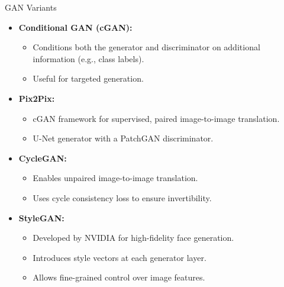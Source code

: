 \begin{frame}[allowframebreaks]{GAN Variants}
\begin{itemize}
        \item \textbf{Conditional GAN (cGAN):}
        \begin{itemize}
            \item Conditions both the generator and discriminator on additional information (e.g., class labels).
            \item Useful for targeted generation.
        \end{itemize}
        \item \textbf{Pix2Pix:}
        \begin{itemize}
            \item cGAN framework for supervised, paired image-to-image translation.
            \item U-Net generator with a PatchGAN discriminator.
        \end{itemize}
        \item \textbf{CycleGAN:}
        \begin{itemize}
            \item Enables unpaired image-to-image translation.
            \item Uses cycle consistency loss to ensure invertibility.
        \end{itemize}
        \item \textbf{StyleGAN:} 
        \begin{itemize}
            \item Developed by NVIDIA for high-fidelity face generation.
            \item Introduces style vectors at each generator layer.
            \item Allows fine-grained control over image features.
        \end{itemize}
    \end{itemize}
\end{frame}






